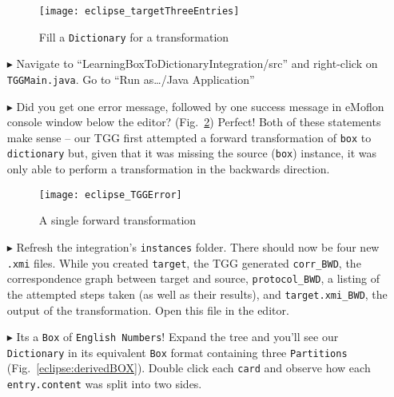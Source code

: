 \begin{itemize}
\vspace{0.5cm}

\begin{figure}[htbp]
\begin{center}
  \texttt{[image: eclipse\_targetThreeEntries]}
  \caption{Fill a \texttt{Dictionary} for a transformation}
  \label{eclipse:dictionaryxmi}
\end{center}
\end{figure}

\item[$\blacktriangleright$] Navigate to ``LearningBox\-To\-Dictionary\-In\-te\-gra\-tion\-/src'' and right-click on \texttt{TGGMain.java}. Go to ``Run
as\ldots/Java Application''

\vspace{0.5cm}

\item[$\blacktriangleright$] Did you get one error message, followed by one success message in eMoflon console window below the editor?
(Fig.~\ref{eclipse:tggERROR}) Perfect! Both of these statements make sense -- our TGG first attempted a forward transformation of \texttt{box} to
\texttt{dictionary} but, given that it was missing the source (\texttt{box}) instance, it was only able to perform a transformation in the backwards direction.

\begin{figure}[htbp]
\begin{center}
  \texttt{[image: eclipse\_TGGError]}
  \caption{A single forward transformation}
  \label{eclipse:tggERROR}
\end{center}
\end{figure}

\newpage

\item[$\blacktriangleright$] Refresh the integration's \texttt{instances} folder. There should now be four new \texttt{.xmi} files. While you created
\texttt{target}, the TGG generated \texttt{corr\_BWD}, the correspondence graph between target and source, \texttt{protocol\_BWD}, a listing of the attempted
steps taken (as well as their results), and \texttt{target.xmi\_BWD}, the output of the transformation. Open this file in the editor.

\item[$\blacktriangleright$] Its a \texttt{Box} of \texttt{English Numbers}! Expand the tree and you'll see our \texttt{Dictionary} in its equivalent
\texttt{Box} format containing three \texttt{Par\-ti\-tions} (Fig.~\ref{eclipse:derivedBOX}). Double click each \texttt{card} and observe how each
\texttt{entry.content} was split into two sides.


\end{itemize}

